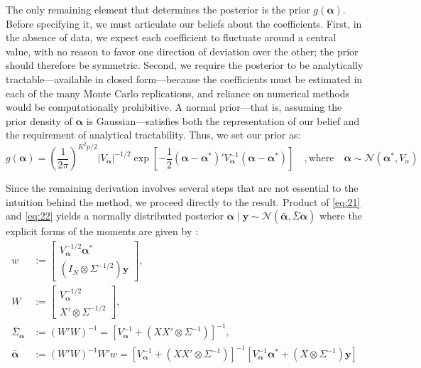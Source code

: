 \documentclass[12pt, a4paper]{article}
\begin{document}
The only remaining element that determines the posterior is the prior $g(\boldsymbol{\alpha})$. Before specifying it, we must articulate our beliefs about the coefficients. First, in the absence of data, we expect each coefficient to fluctuate around a central value, with no reason to favor one direction of deviation over the other; the prior should therefore be symmetric. Second, we require the posterior to be analytically tractable—available in closed form—because the coefficients must be estimated in each of the many Monte Carlo replications, and reliance on numerical methods would be computationally prohibitive. A normal prior—that is, assuming the prior density of $\boldsymbol{\alpha}$ is Gaussian—satisfies both the representation of our belief and the requirement of analytical tractability. Thus, we set our prior as:
\begin{equation} \label{eq:22} 
    g(\boldsymbol{\alpha}) = \left(\frac{1}{2\pi}\right)^{K^2p/2} |V_{\boldsymbol{\alpha}}|^{-1/2} \exp \left[ -\frac{1}{2}(\boldsymbol{\alpha} - \boldsymbol{\alpha}^*)'V_{\boldsymbol{\alpha}}^{-1}(\boldsymbol{\alpha} - \boldsymbol{\alpha}^*) \right] \quad ,\text{where} \quad \boldsymbol{\alpha} \sim \mathcal{N}(\boldsymbol{\alpha}^{*}, V_\alpha) 
\end{equation}

Since the remaining derivation involves several steps that are not essential to the intuition behind the method, we proceed directly to the result. Product of \eqref{eq:21} and \eqref{eq:22} yields a normally distributed posterior $\boldsymbol{\alpha} \mid \mathbf{y} \sim \mathcal{N}(\bar{\boldsymbol{\alpha}}, \bar{\Sigma}{\boldsymbol{\alpha}})$ where the explicit forms of the moments are given by \citet[chapt. 5]{lutkepohlNewIntroductionMultiple2005}:
\begin{equation} \label{eq:23}
\begin{aligned}
w &:= \begin{bmatrix} V_{\boldsymbol{\alpha}}^{-1/2} \boldsymbol{\alpha}^* \\ (I_N \otimes \Sigma^{-1/2})\mathbf{y} \end{bmatrix}, \\
W &:= \begin{bmatrix} V_{\boldsymbol{\alpha}}^{-1/2} \\ X' \otimes \Sigma^{-1/2} \end{bmatrix}, \\
\bar{\Sigma}_{\boldsymbol{\alpha}} &:= (W'W)^{-1} = \left[ V_{\boldsymbol{\alpha}}^{-1} + (XX' \otimes \Sigma^{-1}) \right]^{-1}, \\
\bar{\boldsymbol{\alpha}} &:= (W'W)^{-1} W'w = \left[ V_{\boldsymbol{\alpha}}^{-1} + (XX' \otimes \Sigma^{-1}) \right]^{-1} \left[ V_{\boldsymbol{\alpha}}^{-1} \boldsymbol{\alpha}^* + (X \otimes \Sigma^{-1})\mathbf{y} \right]
\end{aligned}
\end{equation}
\end{document}
